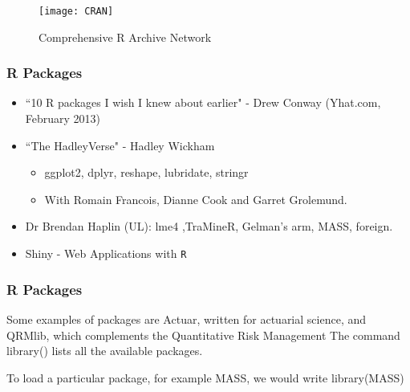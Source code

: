 \documentclass{beamer}
\begin{document}
 	\begin{frame}[fragile]
 		
 		
 		\begin{figure}
 			\centering
 			\texttt{[image: CRAN]}
 			\caption{Comprehensive R Archive Network}
 			
 		\end{figure}
 		
 		
 	\end{frame}
 	
 	
 	\begin{frame}	
 		\frametitle{R Packages}
 		
 		\begin{itemize}
 			\item ``10 R packages I wish I knew about earlier" - Drew Conway (Yhat.com, February 2013)
 			\bigskip \item ``The HadleyVerse" - Hadley Wickham
 			\begin{itemize}
 				
 				\item  ggplot2, dplyr, reshape, lubridate, stringr
 				
 				\item  With Romain Francois, Dianne Cook and Garret Grolemund.
 			\end{itemize}
 			\bigskip
 			\item Dr Brendan Haplin (UL): lme4 ,TraMineR, Gelman's arm, MASS, foreign. 
 			\bigskip
 			\item Shiny - Web Applications with \texttt{R}
 		\end{itemize}
 	\end{frame}
 	\begin{frame}	
 		\frametitle{R Packages}
 		
 		
 		
 		
 		Some examples of packages are Actuar, written for actuarial science, and
 		QRMlib, which complements the Quantitative Risk Management The command library()
 		lists all the available packages. 
 		
 		To load a particular package, for example MASS, we would
 		write
 		library(MASS)
 		
 	\end{frame}
\end{document}
